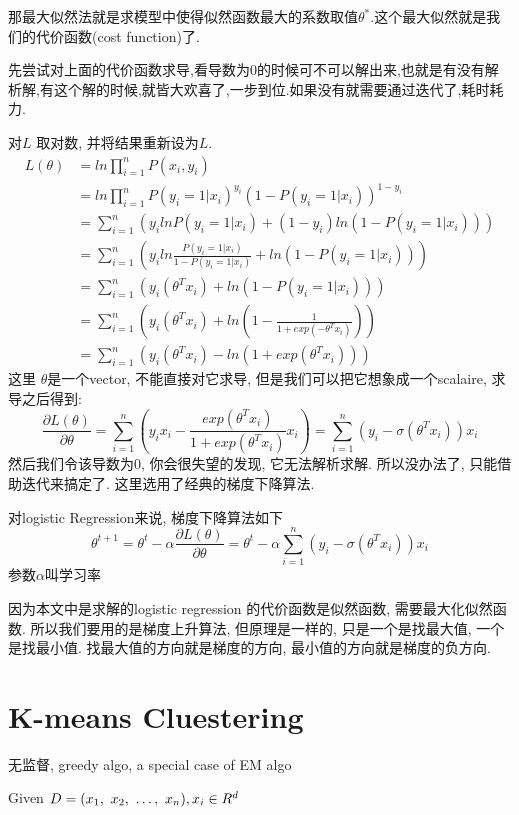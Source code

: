 \documentclass{article}
\begin{document}
那最大似然法就是求模型中使得似然函数最大的系数取值$\theta^*$.这个最大似然就是我们的代价函数(cost function)了.

先尝试对上面的代价函数求导,看导数为0的时候可不可以解出来,也就是有没有解析解,有这个解的时候,就皆大欢喜了,一步到位.如果没有就需要通过迭代了,耗时耗力.

对$L$ 取对数, 并将结果重新设为$L$.
$$
\begin{aligned}
L(\theta)
& = ln \prod_{i = 1}^{n} P(x_i, y_i) \\
& = ln \prod_{i = 1}^{n} P(y_i = 1 | x_i)^{y_i} (1 - P(y_i = 1 | x_i))^{1 - y_i} \\
& = \sum_{i = 1}^{n} (y_i ln P(y_i = 1 | x_i) + (1 - y_i) ln (1 - P(y_i = 1 | x_i))) \\
& = \sum_{i = 1}^{n} (y_i ln \frac{P(y_i = 1 | x_i)}{1 - P(y_i = 1 | x_i)} + ln (1 - P(y_i = 1 | x_i))) \\
& = \sum_{i = 1}^{n} (y_i (\theta^T x_i) + ln (1 - P(y_i = 1 | x_i))) \\
& = \sum_{i = 1}^{n} (y_i (\theta^T x_i) + ln (1 - \frac{1}{1 + exp(- \theta^T x_i)})) \\
& = \sum_{i = 1}^{n} (y_i (\theta^T x_i) - ln (1 + exp(\theta^T x_i)))
\end{aligned}
$$
这里 $\theta$是一个vector, 不能直接对它求导, 但是我们可以把它想象成一个scalaire, 求导之后得到:
$$
\frac{\partial L(\theta)}{\partial \theta}
= \sum_{i = 1}^n (y_i x_i - \frac{exp(\theta^T x_i)}{1 + exp(\theta^T x_i)} x_i)
= \sum_{i = 1}^n (y_i - \sigma(\theta^T x_i)) x_i
$$
然后我们令该导数为$0$, 你会很失望的发现, 它无法解析求解. 所以没办法了, 只能借助迭代来搞定了. 这里选用了经典的梯度下降算法.

对logistic Regression来说, 梯度下降算法如下
$$
\theta^{t + 1}
= \theta^t - \alpha \frac{\partial L(\theta)}{\partial \theta}
= \theta^t - \alpha \sum_{i = 1}^n (y_i - \sigma(\theta^T x_i)) x_i
$$
参数$\alpha$叫学习率

因为本文中是求解的logistic regression 的代价函数是似然函数, 需要最大化似然函数. 所以我们要用的是梯度上升算法, 但原理是一样的, 只是一个是找最大值, 一个是找最小值.
找最大值的方向就是梯度的方向, 最小值的方向就是梯度的负方向.

\section{K-means Cluestering}
无监督, greedy algo, a special case of EM algo

Given $D = (x_1,~x_2,~\ldots,~x_n), x_i \in R^d$
\end{document}

